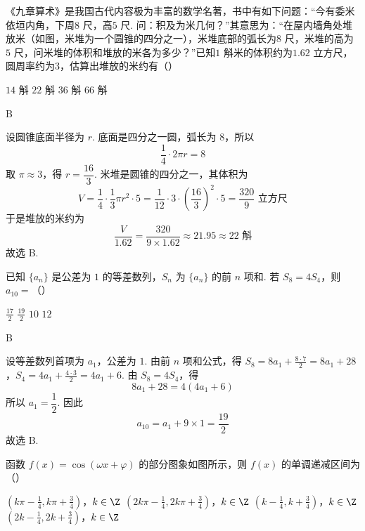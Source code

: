 \begin{problem}
《九章算术》是我国古代内容极为丰富的数学名著，书中有如下问题：“今有委米依垣内角，下周\(8\text{~尺}\)，高\(5\text{~尺}\). 问：积及为米几何？”其意思为：“在屋内墙角处堆放米（如图，米堆为一个圆锥的四分之一），米堆底部的弧长为\(8\text{~尺}\)，米堆的高为\(5\text{~尺}\)，问米堆的体积和堆放的米各为多少？”已知\(1\text{~斛}\)米的体积约为\(1.62\text{~立方尺}\)，圆周率约为\(3\)，估算出堆放的米约有（\quad）


\choices
    {\(14\text{~斛}\)}
    {\(22\text{~斛}\)}
    {\(36\text{~斛}\)}
    {\(66\text{~斛}\)}
\end{problem}

\begin{answer}
B
\end{answer}

\begin{solution}
设圆锥底面半径为 \(r\). 底面是四分之一圆，弧长为 \(8\)，所以
\[
\frac14\cdot2\pi r=8
\]
取 \(\pi\approx3\)，得 \(r=\dfrac{16}{3}\). 米堆是圆锥的四分之一，其体积为
\[
V=\frac14\cdot\frac13\pi r^{2}\cdot5
=\frac{1}{12}\cdot3\cdot\left(\frac{16}{3}\right)^{2}\cdot5
=\frac{320}{9}\text{~立方尺}
\]
于是堆放的米约为
\[
\frac{V}{1.62}=\frac{320}{9\times1.62}\approx21.95\approx22\text{~斛}
\]
故选 B.
\end{solution}

\begin{problem}
已知 \( \{a_{n}\} \) 是公差为 \(1\) 的等差数列，\( S_{n} \) 为 \( \{a_{n}\} \) 的前 \(n\) 项和. 若 \( S_{8}=4S_{4} \)，则 \( a_{10}= \)（\quad）

\choices
    {\(\frac{17}{2}\)}
    {\(\frac{19}{2}\)}
    {\(10\)}
    {\(12\)}
\end{problem}

\begin{answer}
B
\end{answer}

\begin{solution}
设等差数列首项为 \(a_{1}\)，公差为 \(1\). 由前 \(n\) 项和公式，得
\(S_{8}=8a_{1}+\frac{8\cdot7}{2}=8a_{1}+28\)，\(S_{4}=4a_{1}+\frac{4\cdot3}{2}=4a_{1}+6\).
由 \(S_{8}=4S_{4}\)，得
\[
8a_{1}+28=4(4a_{1}+6)
\]
所以 \(a_{1}=\dfrac12\). 因此
\[
a_{10}=a_{1}+9\times1=\frac{19}{2}
\]
故选 B.
\end{solution}

\begin{problem}
函数 \( f(x) = \cos(\omega x + \varphi) \) 的部分图象如图所示，则 \( f(x) \) 的单调递减区间为（\quad）


\choices
    {\(\left(k\pi -\frac{1}{4},k\pi +\frac{3}{4}\right)\)，\(k\in \Z\)}
    {\(\left(2k\pi -\frac{1}{4},2k\pi +\frac{3}{4}\right)\)，\(k\in \Z\)}
    {\(\left(k - \frac{1}{4},k +\frac{3}{4}\right)\)，\(k\in \Z\)}
    {\(\left(2k -\frac{1}{4},2k +\frac{3}{4}\right)\)，\(k\in \Z\)}
\end{problem}

